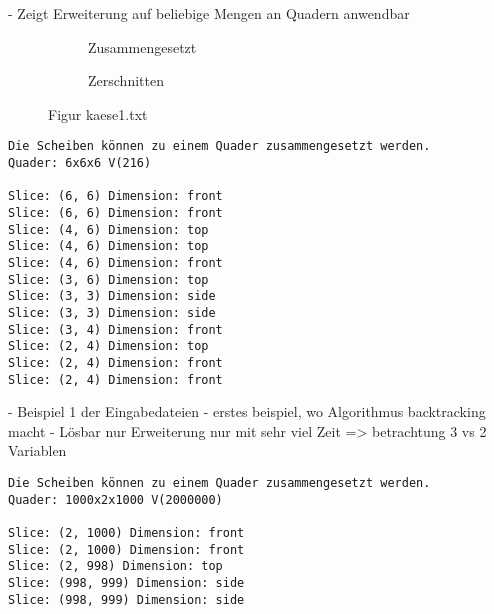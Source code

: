 \documentclass[a4paper,10pt,ngerman]{scrartcl}
\newcommand{\simplecube}[8]%
{
    \begin{scope}[shift={#1}]
        \fill[gray!40,canvas is yz plane at x=#2, opacity=#8] (0,0) rectangle (#3,#4);
        \fill[gray!10,canvas is xz plane at y=#3, opacity=#8] (0,0) rectangle (#2,#4);
        \fill[white  ,canvas is xy plane at z=#4, opacity=#8] (0,0) rectangle (#2,#3);
        \foreach\i/\j in {0/1, 1/1, 1/0}
            {
            \draw[line#5] (0,#3*\i,#4*\j) --++ (#2,0,0);
            \draw[line#6] (#2*\i,0,#4*\j) --++ (0,#3,0);
            \draw[line#7] (#2*\i,#3*\j,0) --++ (0,0,#4);
        }
    \end{scope}
}
\newcommand{\bigSquare}[4]%
{
    \begin{scope}[shift={#1}]
        \simplecube{(0,     0,      0)}     {1}{4}{2}   {a}{a}{a}   {1}
        \simplecube{(1+#4,   0,      0))}    {1}{4}{2}   {a}{a}{a}   {1}
        \simplecube{(0,     0,      2+#4)}   {2}{4}{1}   {a}{a}{a}   {1}
        \simplecube{(2+2*#4,   0,      0)}     {1}{4}{3}   {a}{a}{a}   {0.8}
        \simplecube{(0,     4+#4,    0)}     {3}{1}{3}   {a}{a}{a}   {0.8}
        \simplecube{(0,     5+2*#4,    0)}     {3}{1}{3}   {a}{a}{a}   {0.5}
        \simplecube{(0,     0,      3+2*#4)}   {3}{6}{1}   {a}{a}{a}   {0.8}
        \simplecube{(3+3*#4,   0,      0))}    {1}{6}{4}   {a}{a}{a}   {0.5}
        \simplecube{(0,     0,      4+3*#4)}   {4}{6}{1}   {a}{a}{a}   {0.5}
        \simplecube{(0,     0,      5+4*#4)}   {4}{6}{1}   {a}{a}{a}   {0.2}
        \simplecube{(4+4*#4,   0,      0))}    {1}{6}{6}   {a}{a}{a}   {0.2}
        \simplecube{(5+5*#4,   0,      0))}    {1}{6}{6}   {a}{a}{a}   {0}
    \end{scope}
}
\begin{document}
    - Zeigt Erweiterung auf beliebige Mengen an Quadern anwendbar

    \newpage

    \begin{figure}[H]
        \centering
        \def\a{3.2}
        \def\b{1.2}
        \begin{subfigure}[b]{0.45\textwidth}
            \centering %
            \caption{Zusammengesetzt}\label{fig:figA1}
        \end{subfigure}
        \begin{subfigure}[b]{0.45\textwidth}
            \centering %
            \caption{Zerschnitten}\label{fig:figB1}
        \end{subfigure}
        \caption{Figur kaese1.txt}\label{fig:figAB1}
    \end{figure}

    \begin{lstlisting}[frame=single, title=Programmausgabe kaese1.txt, breaklines=true,label={lst:lstlisting6}]
Die Scheiben können zu einem Quader zusammengesetzt werden.
Quader: 6x6x6 V(216)

Slice: (6, 6) Dimension: front
Slice: (6, 6) Dimension: front
Slice: (4, 6) Dimension: top
Slice: (4, 6) Dimension: top
Slice: (4, 6) Dimension: front
Slice: (3, 6) Dimension: top
Slice: (3, 3) Dimension: side
Slice: (3, 3) Dimension: side
Slice: (3, 4) Dimension: front
Slice: (2, 4) Dimension: top
Slice: (2, 4) Dimension: front
Slice: (2, 4) Dimension: front

    \end{lstlisting}

    - Beispiel 1 der Eingabedateien
    - erstes beispiel, wo Algorithmus backtracking macht
    - Lösbar nur Erweiterung nur mit sehr viel Zeit
    => betrachtung 3 vs 2 Variablen

    \begin{lstlisting}[frame=single, title=Programmausgabe kaese2.txt, breaklines=true,label={lst:lstlisting7}]
Die Scheiben können zu einem Quader zusammengesetzt werden.
Quader: 1000x2x1000 V(2000000)

Slice: (2, 1000) Dimension: front
Slice: (2, 1000) Dimension: front
Slice: (2, 998) Dimension: top
Slice: (998, 999) Dimension: side
Slice: (998, 999) Dimension: side

    \end{lstlisting}
\end{document}
